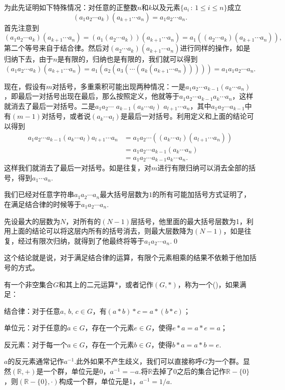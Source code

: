 为此先证明如下特殊情况：对任意的正整数$n$和$k$以及元素$\{a_i\,:\, 1\leq i \leq n\}$成立
\[(a_1a_2\cdots a_{k})(a_{k+1}\cdots a_{n})=a_1a_2\cdots a_n.\]
首先注意到
\[
(a_1a_2\cdots a_{k})(a_{k+1}\cdots a_{n})=(a_1(a_2\cdots a_{k}))(a_{k+1}\cdots a_{n})=a_1((a_2\cdots a_{k})(a_{k+1}\cdots a_{n})),
\]
第二个等号来自于结合律。然后对$(a_2\cdots a_{k})(a_{k+1}\cdots a_{n})$进行同样的操作，如是归纳下去，由于$n$是有限的，归纳也是有限的，我们就可以得到
\[
(a_1a_2\cdots a_{k})(a_{k+1}\cdots a_{n})=a_1(a_2(a_3(\cdots (a_{k}(a_{k+1}\cdots a_{n})))))=a_1a_1a_2\cdots a_n.
\]

现在，假设有$m$对括号，多重乘积可能出现两种情况：一是$a_1a_2\cdots a_{k-1}(a_{k}\cdots a_n)$，即最后一对括号出现在最后，那么按照定义，他就等于$a_1a_2\cdots a_{k-1}a_{k}\cdots a_n$，这样就消去了最后一对括号。二是$a_1a_2\cdots$ $a_{k-1}(a_{k}\cdots a_l)$ $a_{l+1}\cdots a_n$，其中$a_1a_2\cdots a_{k-1}$中有$(m-1)$对括号，或者说$(a_{k}\cdots a_l)$是最后一对括号。利用定义和上面的结论可以得到
\begin{align*}
	a_1a_2\cdots a_{k-1}(a_{k}\cdots a_l)a_{l+1}\cdots a_n&=a_1a_2\cdots ((a_{k}\cdots a_l)(a_{l+1}\cdots a_n))\\
	&=a_1a_2\cdots a_{k-1}(a_{k}\cdots a_n)\\
	&=a_1a_2\cdots a_{k-1}a_{k}\cdots a_n.
\end{align*}
这样我们就消去了最后一对括号。如是往复，对$m$进行有限归纳可以消去全部的括号，得到$a_1\cdots a_n$.

我们已经对任意字符串$a_1a_2\cdots a_n$最大括号层数为$1$的所有可能加括号方式证明了，在满足结合律的时候等于$a_1a_2\cdots a_n$.

先设最大的层数为$N$，对所有的$(N-1)$层括号，他里面的最大括号层数为1，利用上面的结论可以将这层内所有的括号消去，则最大层数降为$(N-1)$，如是往复，经过有限次归纳，就得到了他最终将等于$a_1a_2\cdots a_n$.\qed 

这个结论就是说，对于满足结合律的运算，有限个元素相乘的结果不依赖于他加括号的方式。

\para 有一个非空集合$G$和其上的二元运算$*$，或者记作$(G,*)$，称为一个()，如果满足：

结合律：对于任意$a$, $b$, $c\in G$，有$(a*b)*c=a*(b*c)$；

单位元：对于任意的$a\in G$，存在一个元素$e\in G$，使得$e*a=a*e=a$；

反元素：对于每一个$a\in G$，存在一个元素$b\in G$，使得$b*a=a*b=e$.

$a$的反元素通常记作$a^{-1}$.此外如果不产生歧义，我们可以直接称呼$G$为一个群。显然$(\mathbb{R},+)$是一个群，单位元是0，$a^{-1}=-a$.将$\mathbb{R}$去掉了$0$之后的集合记作$\mathbb{R}-\{0\}$，则$(\mathbb{R}-\{0\},\cdot)$构成一个群，单位元是$1$，$a^{-1}=1/a$.

